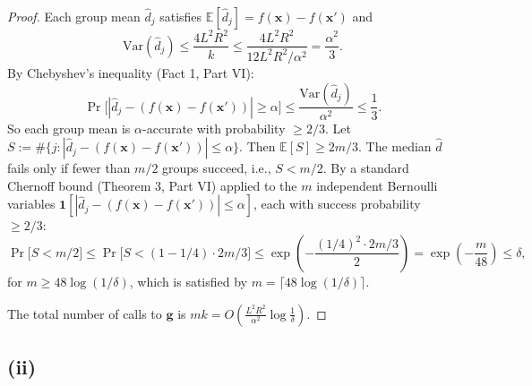 \documentclass[12pt]{article}
\begin{document}
\begin{proof}
Each group mean $\hat{d}_j$ satisfies $\mathbb{E}[\hat{d}_j] = f(\mathbf{x}) - f(\mathbf{x}')$ and
\[
\mathrm{Var}(\hat{d}_j) \leq \frac{4L^2R^2}{k} \leq \frac{4L^2R^2}{12L^2R^2/\alpha^2} = \frac{\alpha^2}{3}.
\]
By Chebyshev's inequality (Fact 1, Part VI):
\[
\Pr\bigl[|\hat{d}_j - (f(\mathbf{x}) - f(\mathbf{x}'))| \geq \alpha\bigr] \leq \frac{\mathrm{Var}(\hat{d}_j)}{\alpha^2} \leq \frac{1}{3}.
\]
So each group mean is $\alpha$-accurate with probability $\geq 2/3$. Let $S := \#\{j : |\hat{d}_j - (f(\mathbf{x})-f(\mathbf{x}'))| \leq \alpha\}$. Then $\mathbb{E}[S] \geq 2m/3$. The median $\hat{d}$ fails only if fewer than $m/2$ groups succeed, i.e., $S < m/2$. By a standard Chernoff bound (Theorem 3, Part VI) applied to the $m$ independent Bernoulli variables $\mathbf{1}[|\hat{d}_j - (f(\mathbf{x})-f(\mathbf{x}'))| \leq \alpha]$, each with success probability $\geq 2/3$:
\[
\Pr\bigl[S < m/2\bigr] \leq \Pr\bigl[S < (1 - 1/4) \cdot 2m/3\bigr] \leq \exp\!\left(-\frac{(1/4)^2 \cdot 2m/3}{2}\right) = \exp\!\left(-\frac{m}{48}\right) \leq \delta,
\]
for $m \geq 48\log(1/\delta)$, which is satisfied by $m = \lceil 48\log(1/\delta) \rceil$.

The total number of calls to $\mathbf{g}$ is $mk = O\!\left(\frac{L^2R^2}{\alpha^2}\log\frac{1}{\delta}\right)$.
\end{proof}

\subsection*{(ii)}
\end{document}
